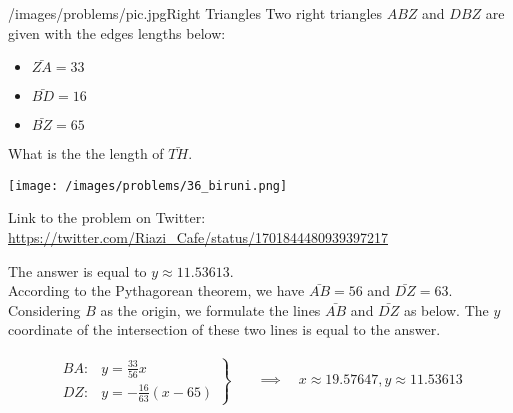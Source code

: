 \begin{problem}{/images/problems/pic.jpg}{Right Triangles}
    Two right triangles $ABZ$ and $DBZ$ are given with the edges lengths below: 

\begin{itemize}
\item $\bar{ZA}=33$

\item $\bar{BD} =16$

\item $\bar{BZ}=65$
\end{itemize}
What is the the length of $\bar{TH}$.

\begin{center}
\texttt{[image: /images/problems/36\_biruni.png]}
\end{center}

Link to the problem on Twitter:  \url{https://twitter.com/Riazi_Cafe/status/1701844480939397217}
\end{problem}
\begin{solution}
The answer is equal to $y \approx 11.53613$.\\[0.2cm]
According to the Pythagorean theorem, we have $\bar{AB}=56$ and $\bar{DZ}=63$. Considering $B$ as the origin, we formulate the lines $\bar{AB}$ and $\bar{DZ}$ as below. The $y$ coordinate of the intersection of these two lines is equal to the answer. %

$$\begin{align}
\left.
\begin{aligned}
BA:& y = \frac{33}{56} x \\
DZ:& y = -\frac{16}{63}(x - 65)
\end{aligned}
\right\}
\quad &\implies \quad
x \approx 19.57647, y \approx 11.53613
\end{align}$$

\end{solution}